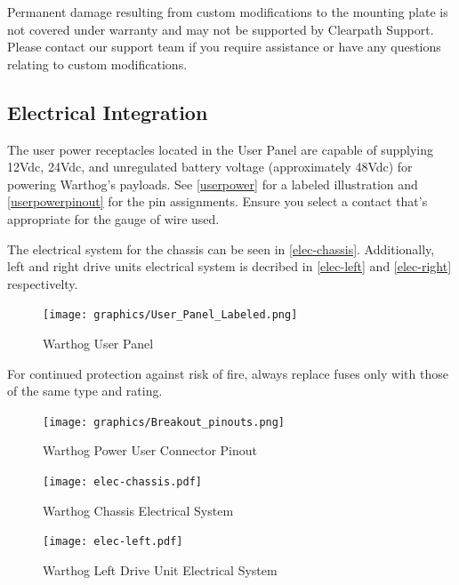 \documentclass[]{clearpath-latex/clearpath-manual}
\begin{document}
\begin{warning}[]
Permanent damage resulting from custom modifications to the mounting plate is not covered under warranty and may not be supported by Clearpath Support.  Please contact our support team if you require assistance or have any questions relating to custom modifications.
\end{warning}


\pagebreak[4]
\subsection{Electrical Integration}
\label{electrical}

The user power receptacles located in the User Panel are capable of supplying 12Vdc, 24Vdc, and unregulated battery voltage (approximately 48Vdc) for powering Warthog's payloads. See \autoref{userpower} for a labeled illustration and \autoref{userpowerpinout} for the pin assignments. Ensure you select a contact that's appropriate for the gauge of wire used.

The electrical system for the chassis can be seen in \autoref{elec-chassis}. Additionally, left and right drive units electrical system is decribed in \autoref{elec-left} and \autoref{elec-right} respectivelty.





\begin{figure}[!h]
  \centering
  \texttt{[image: graphics/User\_Panel\_Labeled.png]}
  \caption{Warthog User Panel}
  \label{userpower}
\end{figure}


\begin{warning}
For continued protection against risk of fire, always replace fuses only with those of the same type and rating.
\end{warning}


\begin{figure}[!htb]
  \centering
  \texttt{[image: graphics/Breakout\_pinouts.png]}
  \caption{Warthog Power User Connector Pinout}
  \label{userpowerpinout}
\end{figure}

\pagebreak
\begin{figure}[!htb]
  \centering
  \texttt{[image: elec-chassis.pdf]}
  \caption{Warthog Chassis Electrical System}
  \label{elec-chassis}
\end{figure}

\begin{figure}[!htb]
  \centering
  \texttt{[image: elec-left.pdf]}
  \caption{Warthog Left Drive Unit Electrical System}
  \label{elec-left}
\end{figure}
\end{document}

